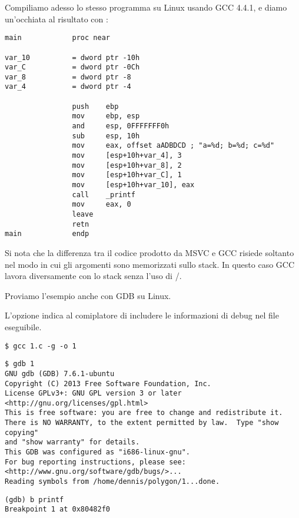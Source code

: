 Compiliamo adesso lo stesso programma su Linux usando GCC 4.4.1, e diamo un'occhiata al risultato con \IDA:

\begin{lstlisting}
main            proc near

var_10          = dword ptr -10h
var_C           = dword ptr -0Ch
var_8           = dword ptr -8
var_4           = dword ptr -4

                push    ebp
                mov     ebp, esp
                and     esp, 0FFFFFFF0h
                sub     esp, 10h
                mov     eax, offset aADBDCD ; "a=%d; b=%d; c=%d"
                mov     [esp+10h+var_4], 3
                mov     [esp+10h+var_8], 2
                mov     [esp+10h+var_C], 1
                mov     [esp+10h+var_10], eax
                call    _printf
                mov     eax, 0
                leave
                retn
main            endp
\end{lstlisting}

Si nota che la differenza tra il codice prodotto da MSVC e GCC risiede soltanto nel modo in cui gli argomenti sono memorizzati sullo stack.
In questo caso GCC lavora diversamente con lo stack senza l'uso di \PUSH/\POP.


Proviamo l'esempio anche con \ac{GDB} su Linux.

L'opzione  indica al comiplatore di includere le informazioni di debug nel file eseguibile.

\begin{lstlisting}
$ gcc 1.c -g -o 1
\end{lstlisting}

\begin{lstlisting}
$ gdb 1
GNU gdb (GDB) 7.6.1-ubuntu
Copyright (C) 2013 Free Software Foundation, Inc.
License GPLv3+: GNU GPL version 3 or later <http://gnu.org/licenses/gpl.html>
This is free software: you are free to change and redistribute it.
There is NO WARRANTY, to the extent permitted by law.  Type "show copying"
and "show warranty" for details.
This GDB was configured as "i686-linux-gnu".
For bug reporting instructions, please see:
<http://www.gnu.org/software/gdb/bugs/>...
Reading symbols from /home/dennis/polygon/1...done.
\end{lstlisting}

\begin{lstlisting}[caption=impostiamo un breakpoint su \printf]
(gdb) b printf
Breakpoint 1 at 0x80482f0
\end{lstlisting}

